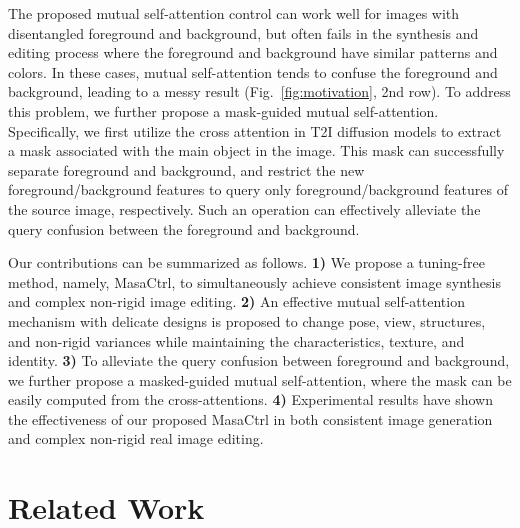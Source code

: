 \documentclass[10pt,twocolumn,letterpaper]{article}
\begin{document}
The proposed mutual self-attention control can work well for images with disentangled foreground and background, but often fails in the synthesis and editing process where the foreground and background have similar patterns and colors. In these cases, mutual self-attention tends to confuse the foreground and background, leading to a messy result (Fig.~\ref{fig:motivation}, 2nd row).
To address this problem, we further propose a mask-guided mutual self-attention. 
Specifically, we first utilize the cross attention in T2I diffusion models to extract a mask associated with the main object in the image. This mask can successfully separate foreground and background, and restrict the new foreground/background features to query only  foreground/background features of the source image, respectively.
Such an operation can effectively alleviate the query confusion between the foreground and background.

Our contributions can be summarized as follows.
\textbf{1)} We propose a tuning-free method, namely, MasaCtrl, to simultaneously achieve consistent image synthesis and complex non-rigid image editing. 
\textbf{2)} An effective mutual self-attention mechanism with delicate designs is proposed to change pose, view, structures, and non-rigid variances while maintaining the characteristics, texture, and identity.
\textbf{3)} To alleviate the query confusion between foreground and background, we further propose a masked-guided mutual self-attention, where the mask can be easily computed from the cross-attentions.
\textbf{4)} Experimental results have shown the effectiveness of our proposed MasaCtrl in both consistent image generation and complex non-rigid real image editing.


\section{Related Work}
\end{document}
